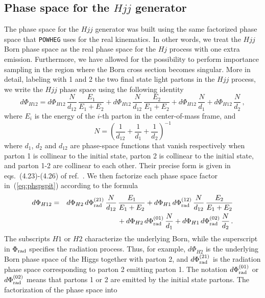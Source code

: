 \documentclass[paper]{JHEP3}
\newcommand\Phirad{\Phi_{\rm rad}}
\newcommand\POWHEG{{\tt POWHEG}}
\begin{document}
\subsection{Phase space for the $Hjj$ generator}
The phase space for the $Hjj$ generator was built using the
same factorized phase space that \POWHEG{} uses for the real kinematics.
In other words, we treat the $Hjj$
Born phase space as the real phase space for the $Hj$ process with one extra
emission.
Furthermore, we have allowed for the possibility to perform importance
sampling in the region where the Born cross section becomes singular.
More in detail, labeling with 1 and 2 the two final state light
partons in the $Hjj$ process, we write the $Hjj$ phase space using the
following identity
\begin{equation}
 d\Phi_{H12}=d\Phi_{H12}\, \frac{N}{d_{12}}\, \frac{E_1}{E_1+E_2}
+d\Phi_{H12} \, \frac{N}{d_{12}}\,\frac{E_2}{E_1+E_2}
+d\Phi_{H12} \, \frac{N}{d_{1}}
+d\Phi_{H12} \, \frac{N}{d_{2}}\,, 
\label{eq:phspspit}
\end{equation}
where $E_i$ is the energy of the $i$-th parton in the center-of-mass frame, and
\begin{equation}
N=\left(\frac{1}{d_{12}}+\frac{1}{d_{1}}+\frac{1}{d_{2}}\right)^{-1}
\end{equation}
where $d_1$, $d_2$ and $d_{12}$ are phase-space functions that vanish respectively
when parton 1 is collinear to the initial state, parton 2 is collinear to
the initial state, and parton 1-2 are collinear to each other. Their precise
form is given in eqs.~(4.23)-(4.26) of ref.~\cite{Alioli:2010xd}.
We then factorize each phase space factor in~(\ref{eq:phspspit}) according
to the formula
\begin{eqnarray}
 d\Phi_{H12}&=&d\Phi_{H2}\,d\Phirad^{(21)} \,\frac{N}{d_{12}}\,\frac{E_1}{E_1+E_2}
+d\Phi_{H1}\, d\Phirad^{(12)} \, \frac{N}{d_{12}}\, \frac{E_2}{E_1+E_2}
\nonumber \\
&&{}+d\Phi_{H2}\, d\Phirad^{(01)} \, \frac{N}{d_{1}}
+d\Phi_{H1}\, d\Phirad^{(02)}\, \frac{N}{d_{2}}\,.
\label{eq:phspspit1}
\end{eqnarray}
The subscripts $H1$ or $H2$ characterize the underlying Born,
while the superscript in $\Phirad$ specifies the radiation process.
Thus, for example, $d\Phi_{H2}$ is the underlying Born phase space of
the Higgs together with parton 2, and $d\Phirad^{(21)}$ is the radiation
phase space corresponding to parton 2 emitting parton 1. The notation
$d\Phirad^{(01)}$ or $d\Phirad^{(02)}$ means that partons 1 or 2 are emitted
by the initial state partons. The factorization of the phase space into
\end{document}
